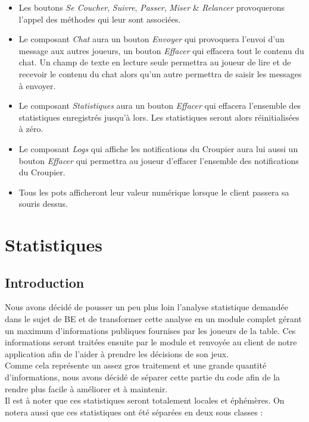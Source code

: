 \begin{itemize}
	\item Les boutons \textit{Se Coucher}, \textit{Suivre}, \textit{Passer}, 
	      \textit{Miser} \& \textit{Relancer} provoquerons l'appel des méthodes 
	      qui leur sont associées.
	\item Le composant \textit{Chat} aura un bouton \textit{Envoyer} qui 
	      provoquera l'envoi d'un message aux autres joueurs, un bouton 
	      \textit{Effacer} qui effacera tout le contenu du chat. Un champ de 
	      texte en lecture seule permettra au joueur de lire et de recevoir le 
	      contenu du chat alors qu'un autre permettra de saisir les messages à 
	      envoyer.
	\item Le composant \textit{Statistiques} aura un bouton \textit{Effacer} qui
	      effacera l'ensemble des statistiques enregistrés jusqu'à lors. Les 
	      statistiques seront alors réinitialisées à zéro.
	\item Le composant \textit{Logs} qui affiche les notifications du Croupier 
	      aura lui aussi un bouton \textit{Effacer} qui permettra au joueur 
	      d'effacer l'ensemble des notifications du Croupier.
	\item Tous les pots afficheront leur valeur numérique lorsque le client 
	      passera sa souris dessus.
\end{itemize}

\section{Statistiques}

\subsection{Introduction}

Nous avons décidé de pousser un peu plus loin l'analyse statistique demandée 
dans le sujet de BE et de transformer cette analyse en un module complet gérant 
un maximum d'informations publiques fournises par les joueurs de la table. 
Ces informations seront traitées ensuite par le module et renvoyée au client de 
notre application afin de l'aider à prendre les décisions de son jeux. \\ 
Comme cela représente un assez gros traitement et une grande quantité 
d'informations, nous avons décidé de séparer cette partie du code afin de la 
rendre plus facile à améliorer et à maintenir.\\
Il est à noter que ces statistiques seront totalement locales et éphémères. 
On notera aussi que ces statistiques ont été séparées en deux sous classes : 

